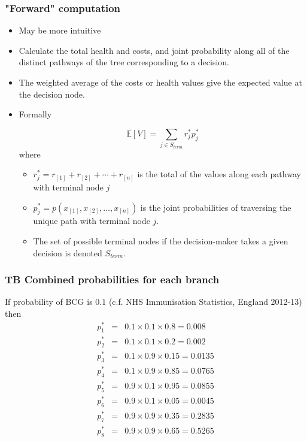 \begin{frame}
\frametitle{"Forward" computation}

 \begin{itemize}
 \item May be more intuitive
\pause
 \item Calculate the total health and costs, and joint probability along all of the distinct pathways of the tree corresponding to a decision.
\pause
 \item The weighted average of the costs or health values give the expected value at the decision node.
\pause

\item Formally

\[
\mathbb{E}[V] = \sum_{j \in S_{term}} r^*_j p^*_j
\]
where

 \begin{itemize}
 \item \(r^*_j = r_{[1]} + r_{[2]} + \cdots + r_{[n]}\) is the total of the values along each pathway with terminal node \(j\)
 \item \(p^*_j = p(x_{[1]}, x_{[2]}, \ldots, x_{[n]})\) is the joint probabilities of traversing the unique path with terminal node \(j\).
 \item The set of possible terminal nodes if the decision-maker takes a given decision is denoted \(S_{term}.\)
 \end{itemize}
\end{itemize}

\end{frame}


\begin{frame}
\frametitle{TB Combined probabilities for each branch}
 If probability of BCG is $0.1$ (c.f. NHS Immunisation Statistics, England 2012-13) then
\begin{eqnarray*}
p^*_1 &=& 0.1 \times 0.1 \times 0.8 = 0.008\\
p^*_2 &=& 0.1 \times 0.1 \times 0.2 = 0.002\\
p^*_3 &=& 0.1 \times 0.9 \times 0.15 = 0.0135\\
p^*_4 &=& 0.1 \times 0.9 \times 0.85 = 0.0765\\
p^*_5 &=& 0.9 \times 0.1 \times 0.95 = 0.0855\\
p^*_6 &=& 0.9 \times 0.1 \times 0.05 = 0.0045\\
p^*_7 &=& 0.9 \times 0.9 \times 0.35 = 0.2835\\
p^*_8 &=& 0.9 \times 0.9 \times 0.65 = 0.5265
\end{eqnarray*}
\end{frame}


